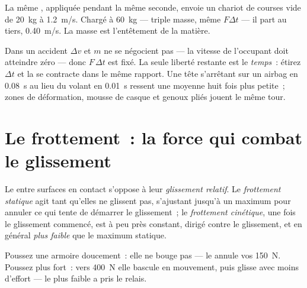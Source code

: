 \begin{example}\label{ex:g11:forces-and-motion:cart}
La même , appliquée pendant la même seconde, envoie un chariot
de courses vide de \qty{20}{kg} à \qty{1.2}{m/s}. Chargé à
\qty{60}{kg} --- triple masse, même $F\Delta t$ --- il part au tiers,
\qty{0.40}{m/s}. La masse est l'entêtement de la matière.
\end{example}

\begin{remark}\label{rem:g11:forces-and-motion:airbag}
Dans un accident $\Delta v$ et $m$ ne se négocient pas --- la vitesse
de l'occupant doit atteindre zéro --- donc $F\,\Delta t$ est fixé. La
seule liberté restante est le \emph{temps}~: étirez $\Delta t$ et la
 se contracte dans le même rapport. Une
tête s'arrêtant sur un airbag en \qty{0.08}{s} au lieu du volant en
\qty{0.01}{s} ressent une  moyenne huit
fois plus petite~; zones de déformation, mousse de casque et genoux
pliés jouent le même tour.
\end{remark}

\section{Le frottement~: la force qui combat le glissement}

\begin{definition}\label{def:g11:forces-and-motion:friction}
Le  entre surfaces en contact
s'oppose à leur \emph{glissement relatif}. Le \emph{frottement
statique} agit tant qu'elles ne glissent pas,
s'ajustant jusqu'à un maximum pour annuler ce qui tente de démarrer le
glissement~; le \emph{frottement cinétique},
une fois le glissement commencé, est à peu près constant, dirigé contre
le glissement, et en général \emph{plus faible} que le maximum
statique.
\end{definition}

\begin{example}\label{ex:g11:forces-and-motion:wardrobe}
Poussez une armoire doucement~: elle ne bouge pas --- le  annule vos \qty{150}{N}. Poussez plus fort~: vers \qty{400}{N}
elle bascule en mouvement, puis glisse avec moins d'effort --- le
 plus faible a pris le
relais.
\end{example}


